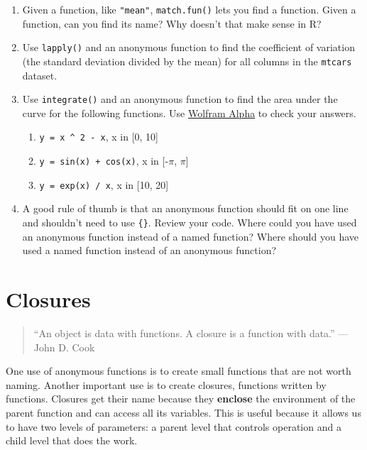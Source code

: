 \begin{enumerate}
\def\labelenumi{\arabic{enumi}.}
\item
  Given a function, like \texttt{"mean"}, \texttt{match.fun()} lets you
  find a function. Given a function, can you find its name? Why doesn't
  that make sense in R?
\item
  Use \texttt{lapply()} and an anonymous function to find the
  coefficient of variation (the standard deviation divided by the mean)
  for all columns in the \texttt{mtcars} dataset.
\item
  Use \texttt{integrate()} and an anonymous function to find the area
  under the curve for the following functions. Use
  \href{http://www.wolframalpha.com/}{Wolfram Alpha} to check your
  answers.

  \begin{enumerate}
  \def\labelenumii{\arabic{enumii}.}
  \tightlist
  \item
    \texttt{y\ =\ x\ \^{}\ 2\ -\ x}, x in {[}0, 10{]}
  \item
    \texttt{y\ =\ sin(x)\ +\ cos(x)}, x in {[}-\(\pi\), \(\pi\){]}
  \item
    \texttt{y\ =\ exp(x)\ /\ x}, x in {[}10, 20{]}
  \end{enumerate}
\item
  A good rule of thumb is that an anonymous function should fit on one
  line and shouldn't need to use \texttt{\{\}}. Review your code. Where
  could you have used an anonymous function instead of a named function?
  Where should you have used a named function instead of an anonymous
  function?
\end{enumerate}

\hypertarget{closures}{%
\section{Closures}\label{closures}}

\begin{quote}
``An object is data with functions. A closure is a function with data.''
--- John D. Cook
\end{quote}

One use of anonymous functions is to create small functions that are not
worth naming. Another important use is to create closures, functions
written by functions. Closures get their name because they
\textbf{enclose} the environment of the parent function and can access
all its variables. This is useful because it allows us to have two
levels of parameters: a parent level that controls operation and a child
level that does the work. 

